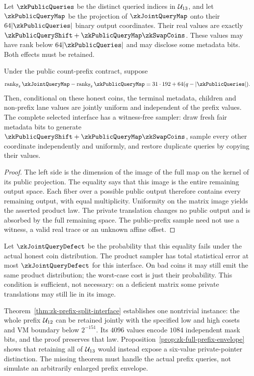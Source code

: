 Let $\zkPublicQueries$ be the distinct queried indices in $\mathcal{U}_{13}$, and let $\zkPublicQueryMap$ be the projection of $\zkJointQueryMap$ onto their $64|\zkPublicQueries|$ binary output coordinates. Their real values are exactly $\zkPublicQueryShift+\zkPublicQueryMap\zkSwapCoins$. These values may have rank below $64|\zkPublicQueries|$ and may disclose some metadata bits. Both effects must be retained.

\begin{lemma}\label{lem:zk-query-fiber}
Under the public count-prefix contract, suppose
\[
 \operatorname{rank}_{\Ftwo}\zkJointQueryMap
 -\operatorname{rank}_{\Ftwo}\zkPublicQueryMap
 =31\cdot192+64(q-|\zkPublicQueries|).
\]
Then, conditional on these honest coins, the terminal metadata, children and non-prefix lane values are jointly uniform and independent of the prefix values. The complete selected interface has a witness-free sampler: draw fresh fair metadata bits to generate $\zkPublicQueryShift+\zkPublicQueryMap\zkSwapCoins$, sample every other coordinate independently and uniformly, and restore duplicate queries by copying their values.
\end{lemma}
\begin{proof}
The left side is the dimension of the image of the full map on the kernel of its public projection. The equality says that this image is the entire remaining output space. Each fiber over a possible public output therefore contains every remaining output, with equal multiplicity. Uniformity on the matrix image yields the asserted product law. The private translation changes no public output and is absorbed by the full remaining space. The public-prefix sample need not use a witness, a valid real trace or an unknown affine offset.
\end{proof}

Let $\zkJointQueryDefect$ be the probability that this equality fails under the actual honest coin distribution. The product sampler has total statistical error at most $\zkJointQueryDefect$ for this interface. On bad coins it may still emit the same product distribution; the worst-case cost is just their probability. This condition is sufficient, not necessary: on a deficient matrix some private translations may still lie in its image.

Theorem~\ref{thm:zk-prefix-split-interface} establishes one nontrivial instance: the whole prefix $\mathcal{U}_{12}$ can be retained jointly with the specified low and high cosets and VM boundary below $2^{-151}$. Its $4096$ values encode $1084$ independent mask bits, and the proof preserves that law. Proposition~\ref{prop:zk-full-prefix-envelope} shows that retaining all of $\mathcal{U}_{13}$ would instead expose a six-value private-pointer distinction. The missing theorem must handle the actual prefix queries, not simulate an arbitrarily enlarged prefix envelope.

